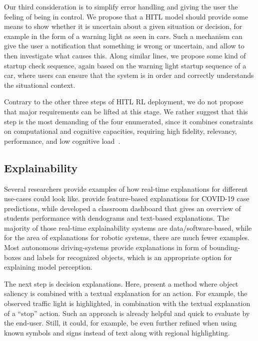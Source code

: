 \documentclass[twoside,11pt]{article}
\begin{document}
\begin{enumerate}
Our third consideration is to simplify error handling and giving the user the feeling of being in control. We propose that a HITL model should provide some means to show whether it is uncertain about a given situation or decision, for example in the form of a warning light as seen in cars. Such a mechanism can give the user a notification that something is wrong or uncertain, and allow to then investigate what causes this.  Along similar lines, we propose some kind of startup check sequence, again based on the warning light startup sequence of a car, where users can ensure that the system is in order and correctly understands the situational context.

Contrary to the other three steps of HITL RL deployment, we do not propose that major requirements can be lifted at this stage. We rather suggest that this step is the most demanding of the four enumerated, since it combines constraints on computational and cognitive capacities, requiring high fidelity, relevancy, performance, and low cognitive load~\citep{milani2022survey}.

\subsection{Explainability}

Several researchers provide examples of how real-time explanations for different use-cases could look like. \citet{RodriguezEtAl:2021:DeepCovidxAI} provide feature-based explanations for COVID-19 case predictions, while \citet{Kulkarni:2021:EducationAIDashboard} developed a classroom dashboard that gives an overview of students performance with dendograms and text-based explanations. The majority of those real-time explainability systems are data/software-based, while for the area of explanations for robotic systems, there are much fewer examples. Most autonomous driving-systems provide explanations in form of bounding-boxes and labels for recognized objects, which is an appropriate option for explaining model perception. 

The next step is decision explanations. Here, \citet{Ben-YounesEtAl:2022:DrivingBehaviorEx} present a method where object saliency is combined with a textual explanation for an action. For example, the observed traffic light is highlighted, in combination with the textual explanation of a ``stop'' action. Such an approach is already helpful and quick to evaluate by the end-user. Still, it could, for example, be even further refined when using known symbols and signs instead of text along with regional highlighting.


\end{enumerate}
\end{document}
